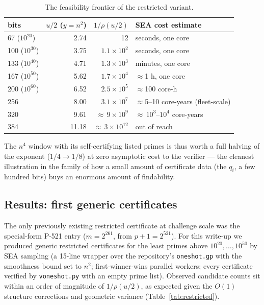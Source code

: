 \documentclass[11pt]{amsart}
\theoremstyle{plain}
\theoremstyle{definition}
\theoremstyle{remark}
\begin{document}
\begin{table}[htbp]
\centering\footnotesize
\begin{tabular}{@{}lrrl@{}}
\toprule
bits & $u/2$ ($y{=}n^2$) & $1/\rho(u/2)$ & SEA cost estimate\\
\midrule
67 ($10^{20}$) & 2.74 & 12 & seconds, one core\\
100 ($10^{30}$) & 3.75 & $1.1\times 10^2$ & seconds, one core\\
133 ($10^{40}$) & 4.71 & $1.3\times 10^3$ & minutes, one core\\
167 ($10^{50}$) & 5.62 & $1.7\times 10^4$ & ${\approx}$1 h, one core\\
200 ($10^{60}$) & 6.52 & $2.5\times 10^5$ & ${\approx}$100 core-h\\
256 & 8.00 & $3.1\times 10^7$ & ${\approx}$5--10 core-years (fleet-scale)\\
320 & 9.61 & ${\approx}\,9\times 10^9$ & ${\approx}\,10^3$--$10^4$ core-years\\
384 & 11.18 & ${\approx}\,3\times 10^{12}$ & out of reach\\
\bottomrule
\end{tabular}
\medskip
\caption{The feasibility frontier of the restricted variant.}
\label{tab:frontier}
\end{table}

The $n^4$ window with its self-certifying listed primes is thus worth a full halving of the exponent
($1/4 \to 1/8$) at zero asymptotic cost to the verifier --- the cleanest illustration in the family of
how a small amount of certificate data (the $q_i$, a few hundred bits) buys an enormous amount of
findability.

\subsection{Results: first generic certificates}\label{sec:restrictedresults}

The only previously existing restricted certificate at challenge scale was the special-form P-521 entry
($m = 2^{261}$, from $p+1 = 2^{521}$).  For this write-up we produced generic restricted certificates
for the least primes above $10^{20}, \dots, 10^{50}$ by SEA sampling (a 15-line wrapper over the
repository's \texttt{oneshot.gp} with the smoothness bound set to $n^2$; first-winner-wins parallel
workers; every certificate verified by \texttt{voneshot.py} with an empty prime list).  Observed
candidate counts sit within an order of magnitude of $1/\rho(u/2)$, as expected given the $O(1)$
structure corrections and geometric variance (Table~\ref{tab:restricted}).
\end{document}
